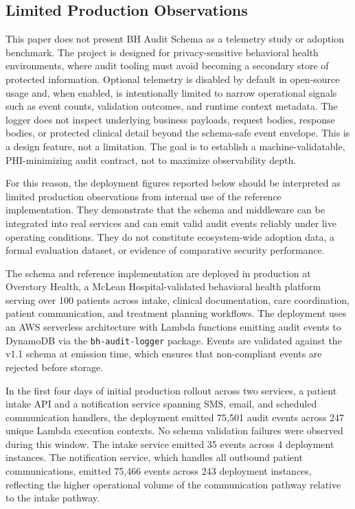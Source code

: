 \documentclass[11pt,a4paper]{article}
\begin{document}
\subsection{Limited Production Observations}

This paper does not present BH Audit Schema as a telemetry study or adoption benchmark. The project is designed for privacy-sensitive behavioral health environments, where audit tooling must avoid becoming a secondary store of protected information. Optional telemetry is disabled by default in open-source usage and, when enabled, is intentionally limited to narrow operational signals such as event counts, validation outcomes, and runtime context metadata. The logger does not inspect underlying business payloads, request bodies, response bodies, or protected clinical detail beyond the schema-safe event envelope. This is a design feature, not a limitation. The goal is to establish a machine-validatable, PHI-minimizing audit contract, not to maximize observability depth.

For this reason, the deployment figures reported below should be interpreted as limited production observations from internal use of the reference implementation. They demonstrate that the schema and middleware can be integrated into real services and can emit valid audit events reliably under live operating conditions. They do not constitute ecosystem-wide adoption data, a formal evaluation dataset, or evidence of comparative security performance.

The schema and reference implementation are deployed in production at Overstory Health, a McLean Hospital-validated behavioral health platform serving over 100 patients across intake, clinical documentation, care coordination, patient communication, and treatment planning workflows. The deployment uses an AWS serverless architecture with Lambda functions emitting audit events to DynamoDB via the \texttt{bh-audit-logger} package. Events are validated against the v1.1 schema at emission time, which ensures that non-compliant events are rejected before storage.

In the first four days of initial production rollout across two services, a patient intake API and a notification service spanning SMS, email, and scheduled communication handlers, the deployment emitted 75,501 audit events across 247 unique Lambda execution contexts. No schema validation failures were observed during this window. The intake service emitted 35 events across 4 deployment instances. The notification service, which handles all outbound patient communications, emitted 75,466 events across 243 deployment instances, reflecting the higher operational volume of the communication pathway relative to the intake pathway.
\end{document}
